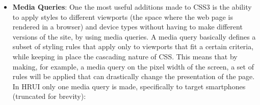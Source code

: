 \begin{itemize}
  \item \textbf{Media Queries}: One the most useful additions made to CSS3 is the ability to apply styles to different viewports (the space where the web page is rendered in a browser) and device types without having to make different versions of the site, by using media queries. A media query basically defines a subset of styling rules that apply only to viewports that fit a certain criteria, while keeping in place the cascading nature of CSS. This means that by making, for example, a media query on the pixel width of the screen, a set of rules will be applied that can drastically change the presentation of the page. In HRUI only one media query is made, specifically to target smartphones (truncated for brevity):\\


\end{itemize}
